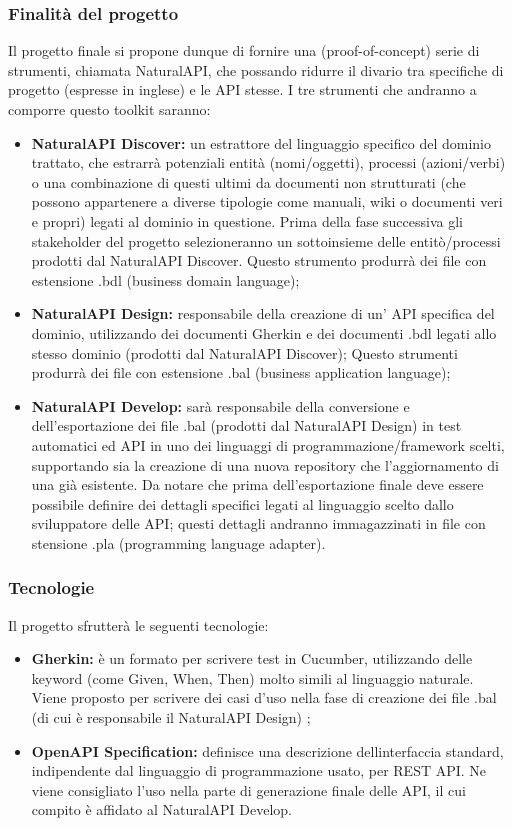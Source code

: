     \subsubsection{Finalità del progetto}
   Il progetto finale si propone dunque di fornire una (proof-of-concept) serie di strumenti,  chiamata NaturalAPI, che possando ridurre il divario tra specifiche di progetto (espresse in inglese) e le API stesse. I tre strumenti che andranno a comporre questo toolkit  saranno:
   \begin{itemize}
   	\item \textbf{NaturalAPI Discover: }un estrattore del linguaggio specifico del dominio trattato, che estrarrà potenziali entità (nomi/oggetti), processi (azioni/verbi) o una combinazione di questi ultimi da documenti non strutturati (che possono appartenere a diverse tipologie come manuali, wiki o documenti veri e propri) legati al dominio in questione. Prima della fase successiva gli stakeholder del progetto selezioneranno un sottoinsieme delle entitò/processi prodotti dal NaturalAPI Discover. Questo strumento produrrà dei file con estensione .bdl (business domain language);
   	
   	\item \textbf{NaturalAPI Design: }responsabile della creazione di un' API specifica del dominio, utilizzando dei documenti Gherkin e dei documenti .bdl legati allo stesso dominio (prodotti dal NaturalAPI Discover); Questo strumenti produrrà dei file con estensione .bal (business application language);
   	
   	\item \textbf{NaturalAPI Develop: }sarà responsabile della conversione e dell'esportazione dei file .bal (prodotti dal NaturalAPI Design) in test automatici ed API in uno dei linguaggi di programmazione/framework scelti, supportando sia la creazione di una nuova repository che l'aggiornamento di una già esistente. Da notare che prima dell'esportazione finale deve essere possibile definire dei dettagli specifici legati al linguaggio scelto dallo sviluppatore delle API; questi dettagli andranno immagazzinati in file con stensione .pla (programming language adapter).
   	\end{itemize}
    
    \subsubsection{Tecnologie}
     	Il progetto sfrutterà le seguenti tecnologie:
     	\begin{itemize}
     		\item \textbf{Gherkin: }è un formato per scrivere test in Cucumber, utilizzando delle keyword (come Given, When, Then) molto simili al linguaggio naturale. Viene proposto per scrivere dei casi d'uso nella fase di creazione dei file .bal (di cui è responsabile il NaturalAPI Design) ;
     		\item \textbf{OpenAPI Specification: }definisce una descrizione dellinterfaccia standard, indipendente dal linguaggio di programmazione usato, per REST API. Ne viene consigliato l'uso nella parte di generazione finale delle API, il cui compito è affidato al NaturalAPI Develop.
     	\end{itemize}
